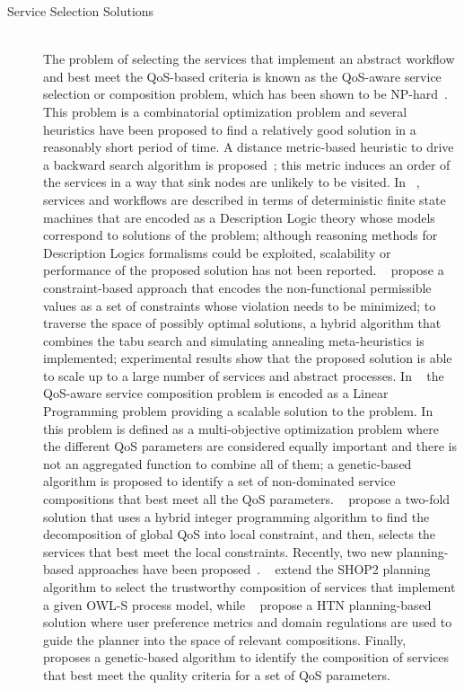 \documentclass{article}
\begin{document}
{\begin{description}
\item[Service Selection Solutions] \mbox{}\\
The problem of selecting the services that implement an abstract workflow and best meet the QoS-based criteria  is known as the QoS-aware service selection or composition problem, which has been shown to be NP-hard~\cite{Hiroshi2008}. This problem is a combinatorial optimization problem and several heuristics have been proposed to find a relatively good solution in a reasonably short period of time.  A  distance metric-based heuristic  to drive a backward search algorithm  is proposed~\cite{rahmani08}; this metric induces an order of the services in a way that sink nodes are unlikely to be visited. In ~\cite{berardi05,berardi08,berardi06}, services and workflows are described in terms of deterministic finite state machines that are encoded as a Description Logic theory whose models correspond to solutions of the problem;  although reasoning methods for Description Logics formalisms could be exploited, scalability or performance of the proposed solution has not been reported.  ~\cite{myoung08} propose a constraint-based approach that encodes the non-functional permissible values as a set of constraints whose violation needs to be minimized; to traverse the space of possibly optimal solutions, a hybrid algorithm that combines the tabu search and simulating annealing meta-heuristics is implemented; experimental results show that the proposed solution is able to scale up to a large number of services and abstract processes.  In ~\cite{cardellini07} the QoS-aware service composition problem is encoded as a Linear Programming problem providing a scalable solution to the problem.  In ~\cite{Hiroshi2008}  this problem  is defined as a multi-objective optimization problem where the different QoS parameters are considered equally important and there is not an aggregated function to combine all of them; a genetic-based algorithm is proposed to identify a set of non-dominated service compositions that best meet all the QoS parameters.  ~\cite{alrifaiR09} propose a two-fold solution that uses a hybrid integer programming algorithm to find the decomposition of global QoS into local constraint, and then,  selects the services that best meet the local constraints.   
Recently,  two new planning-based approaches have been proposed~\cite{kuterG09,sohrabiM09}.  ~\cite{kuterG09} extend the SHOP2 planning algorithm to select the trustworthy composition of services that implement a given OWL-S process model, while ~\cite{sohrabiM09}  propose a HTN planning-based solution where user preference metrics and domain regulations are used to guide the planner into the space of relevant compositions. Finally, ~\cite{lecue09} proposes a genetic-based algorithm to identify the composition of services that best meet the quality criteria for a set of QoS parameters.  


\end{description}}
\end{document}
